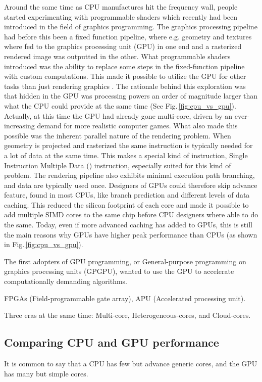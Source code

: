 Around the same time as CPU manufactures hit the frequency wall, people started experimenting with programmable shaders which recently had been introduced in the field of graphics programming. The graphics processing pipeline had before this been a fixed function pipeline, where e.g. geometry and textures where fed to the graphics processing unit (GPU) in one end and a rasterized rendered image was outputted in the other. What programmable shaders  introduced was the ability to replace some steps in the fixed-function pipeline with custom computations. This made it possible to utilize the GPU for other tasks than just rendering graphics \cite{Seland2007}. The rationale behind this exploration was that hidden in the GPU was processing powers an order of magnitude larger than what the CPU could provide at the same time (See Fig.\,\ref{fig:cpu_vs_gpu}). Actually, at this time the GPU had already gone multi-core, driven by an ever-increasing demand for more realistic computer games. What also made this possible was the inherent parallel nature of the rendering problem. When geometry is projected and rasterized the same instruction is typically needed for a lot of data at the same time. This makes a special kind of instruction, Single Instruction Multiple Data () instruction, especially suited for this kind of problem. The rendering pipeline also exhibits minimal execution path branching, and data are typically used once. Designers of GPUs could therefore skip advance feature, found in most CPUs, like branch prediction and different levels of data caching. This reduced the silicon footprint of each core and made it possible to add multiple SIMD cores to the same chip before CPU designers where able to do the same. Today, even if more advanced caching has added to GPUs, this is still the main reasons why GPUs have higher peak performance than CPUs (as shown in Fig.\,\ref{fig:cpu_vs_gpu}).

The first adopters of GPU programming, or General-purpose programming on graphics processing units (GPGPU), wanted to use the GPU to accelerate computationally demanding algorithms. 

FPGAs (Field-programmable gate array), APU (Accelerated processing unit).

Three eras at the same time: Multi-core, Heterogeneous-cores, and Cloud-cores.

\subsection{Comparing CPU and GPU performance} 
It is common to say that a CPU has few but advance generic cores, and the GPU has many but simple cores.

